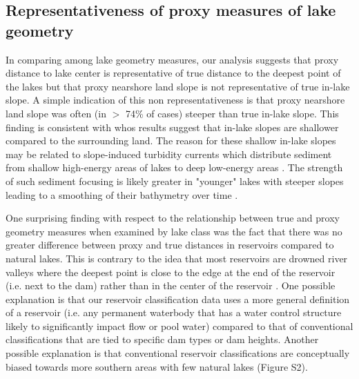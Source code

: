 \documentclass[draft]{agujournal2019}
\begin{document}
\subsection{Representativeness of proxy measures of lake geometry}
\noindent
In comparing among lake geometry measures, our analysis suggests that proxy distance to lake center is representative of true distance to the deepest point of the lakes but that proxy nearshore land slope is not representative of true in-lake slope. A simple indication of this non representativeness is that proxy nearshore land slope was often (in $>$ 74\% of cases) steeper than true in-lake slope. This finding is consistent with  whos results suggest that in-lake slopes are shallower compared to the surrounding land. The reason for these shallow in-lake slopes may be related to slope-induced turbidity currents which distribute sediment from shallow high-energy areas of lakes to deep low-energy areas \cite{hakansonLakeBottomDynamics1981, johanssonNewApproachesModelling2007}. The strength of such sediment focusing is likely greater in "younger" lakes with steeper slopes leading to a smoothing of their bathymetry over time \cite{blaisInfluenceLakeMorphometry1995}.

One surprising finding with respect to the relationship between true and proxy geometry measures when examined by lake class was the fact that there was no greater difference between proxy and true distances in reservoirs compared to natural lakes. This is contrary to the idea that most reservoirs are drowned river valleys where the deepest point is close to the edge at the end of the reservoir (i.e. next to the dam) rather than in the center of the reservoir \cite{lanza1985interactions}. One possible explanation is that our reservoir classification data uses a more general definition of a reservoir (i.e. any permanent waterbody that has a water control structure likely to significantly impact flow or pool water) compared to that of conventional classifications that are tied to specific dam types or dam heights. Another possible explanation is that conventional reservoir classifications are conceptually biased towards more southern areas with few natural lakes (Figure S2).
\end{document}
